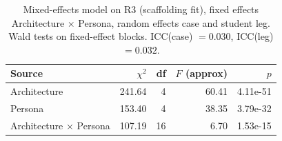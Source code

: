 \begin{table}[htbp]
\centering
\caption{Mixed-effects model on R3 (scaffolding fit), fixed effects Architecture $\times$ Persona, random effects case and student leg. Wald tests on fixed-effect blocks. ICC(case) $= 0.030$, ICC(leg) $= 0.032$.}
\label{tab:anova-R3}
\begin{tabular}{lrrrr}
\toprule
Source & $\chi^2$ & df & $F$ (approx) & $p$ \\
\midrule
Architecture & 241.64 & 4 & 60.41 & 4.11e-51 \\
Persona & 153.40 & 4 & 38.35 & 3.79e-32 \\
Architecture $\times$ Persona & 107.19 & 16 & 6.70 & 1.53e-15 \\
\bottomrule
\end{tabular}
\end{table}
